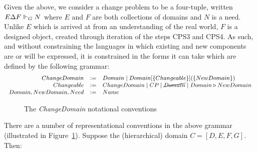 \documentclass[runningheads,a4paper]{llncs}
\begin{document}
Given the above, we consider a change problem to be a four-tuple, written $E\Delta F\Vdash_G N$ where $E$ and $F$ are both collections of domains and $N$ is a need. Unlike $E$ which is arrived at from an understanding of the real world, $F$ is a designed object, created through iteration of the steps CPS3 and CPS4. As such, and without constraining the languages in which existing and new components are or will be expressed, it is constrained in the forms it can take which are defined by the following grammar:
%
\[\footnotesize\begin{array}{rcll}
	ChangeDomain &:=& Domain \mid Domain[\{Changeable\}](\{NewDomain\})\\
	Changeable &:=& ChangeDomain \mid CP \mid \cancel{Domain} \mid Domain \replacedBy NewDomain\\
	Domain, NewDomain, Need &:=& Name
\end{array}\]
%
\begin{figure}
  \caption{The \textit{ChangeDomain} notational conventions}
  \label{fig:notationIllustration}
\end{figure}
There are a number of representational conventions in the above grammar (illustrated in Figure~\ref{fig:notationIllustration}). Suppose the (hierarchical) domain $C=[D,E,F,G]$. Then:
\end{document}
